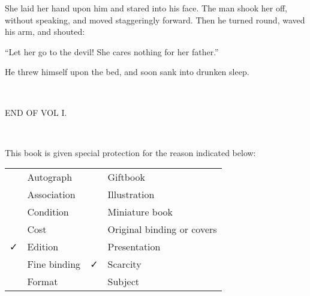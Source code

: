 She laid her hand upon him and stared into his face. The man shook her
off, without speaking, and moved staggeringly forward. Then he turned
round, waved his arm, and shouted:

{\protect\hypertarget{291}{}{}}``Let her go to the devil! She cares
nothing for her father.''

He threw himself upon the bed, and soon sank into drunken sleep.

~

END OF VOL I.

~

{\protect\hypertarget{-}{}{}}This book is given special protection for
the reason indicated below:

\begin{longtable}[]{@{}llll@{}}
\toprule
& Autograph & & Giftbook\tabularnewline
& Association & & Illustration\tabularnewline
& Condition & & Miniature book\tabularnewline
& Cost & & Original binding or covers\tabularnewline
✓ & Edition & & Presentation\tabularnewline
& Fine binding & ✓ & Scarcity\tabularnewline
& Format & & Subject\tabularnewline
\bottomrule
\end{longtable}
